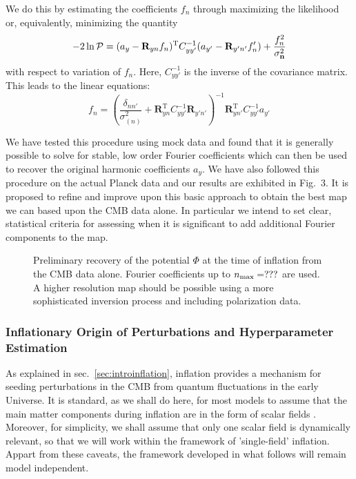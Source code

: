 \documentclass[psfig,11pt]{article}
\begin{document}
We do this by estimating the coefficients $f_n$ through maximizing the likelihood or, equivalently, minimizing the quantity
\begin{equation}
-2\ln{\cal P}=(a_y- \mathbf{R}_{yn}f_n)^{\mathrm{T}}C_{yy'}^{-1}(a_{y'}-\mathbf{R}_{y'n'}f_n')+\frac{f_n^2}{\sigma_{\bf n}^2}
\end{equation}
with respect to variation of $f_n$. Here, $C_{yy'}^{-1}$ is the inverse of the covariance matrix. This leads to the linear equations:
\begin{equation}
f_n=\left(\frac{\delta_{nn'}}{\sigma_{(n)}^2}+\mathbf{R}_{yn}^{\mathrm{T}}C_{yy'}^{-1}\mathbf{R}_{y'n'}\right)^{-1}\mathbf{R}^{\mathrm{T}}_{yn'}C_{yy'}^{-1}a_{y'}
\end{equation}

We have tested this procedure using mock data and found that it is generally possible to solve for stable, low order Fourier coefficients which can then be used to recover the original harmonic coefficients $a_y$. We have also followed this procedure on the actual Planck data and our results are exhibited in Fig.~3. It is proposed to refine and improve upon this basic approach to obtain the best map we can based upon the CMB data alone. In particular we intend to set clear, statistical criteria for assessing when it is significant to add additional Fourier components to the map.
\begin{figure}[t]
\centering
\caption{Preliminary recovery of the potential $\Phi$ at the time of inflation from the CMB data alone. Fourier coefficients up to $n_{\rm max}=???$ are used. A higher resolution map should be possible using a more sophisticated inversion process and including polarization data.}
\end{figure}

\subsubsection{Inflationary Origin of Perturbations and Hyperparameter Estimation}

\label{sec:researchinflation}

As explained in sec.~\ref{sec:introinflation}, inflation provides a mechanism for seeding perturbations in the CMB from quantum fluctuations in the early Universe. It is standard, as we shall do here, for most models to assume that the main matter components during inflation are in the form of scalar fields%
. Moreover, for simplicity, we shall assume that only one scalar field is dynamically relevant, so that we will work within the framework of 'single-field' inflation. Appart from these caveats, the framework developed in what follows will remain model independent.
\end{document}
